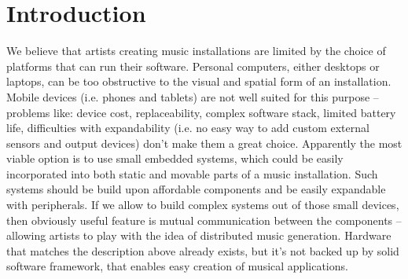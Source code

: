 \documentclass{article}
\title{\papertitle}
\begin{document}
\capstartfalse %
\maketitle %
\capstarttrue %

\begin{abstract}
Application of embedded systems to music installations is limited due to
absence of convenient software development tools.  This is a very unfortunate
situation as these systems offer an array of advantages over desktop or laptop
computers.  Small size of embedded systems is a factor that makes them
especially suitable for incorporation into various forms of art.  These devices
are effortlessly expandable with various sensors and can produce rich
audio-visual effects.  Their low price makes it affordable to build and
experiment with networks of cooperating devices that generate music.

In this paper we describe the design of Komeda -- implementation platform for
interactive algorithmic music tailored for embedded systems.  The framework
consists of music description language, intermediate binary representation and
portable virtual machine with user defined extensions (called modules).
\end{abstract}

\section{Introduction}
\label{sec:introduction}
We believe that artists creating music installations are limited by the choice
of platforms that can run their software.  Personal computers, either desktops
or laptops, can be too obstructive to the visual and spatial form of an
installation.  Mobile devices (i.e. phones and tablets) are not well suited for
this purpose -- problems like: device cost, replaceability, complex software
stack, limited battery life, difficulties with expandability (i.e. no easy way
to add custom external sensors and output devices) don't make them a great
choice.  Apparently the most viable option is to use small embedded systems,
which could be easily incorporated into both static and movable parts of a
music installation.  Such systems should be build upon affordable components
and be easily expandable with peripherals.  If we allow to build complex
systems out of those small devices, then obviously useful feature is mutual
communication between the components -- allowing artists to play with the idea
of distributed music generation.  Hardware that matches the description above
already exists, but it's not backed up by solid software framework, that
enables easy creation of musical applications.
\end{document}
